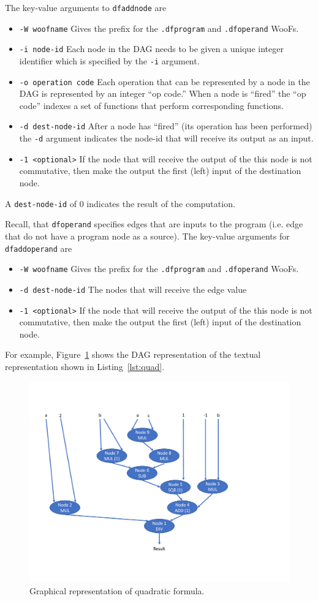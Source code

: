 \documentclass[10pt]{article}
\begin{document}
The key-value arguments to \verb+dfaddnode+ are
\begin{itemize}
\item \verb+-W woofname+ Gives the prefix for the \verb+.dfprogram+ and
\verb+.dfoperand+ WooFs.
\item \verb+-i node-id+ Each node in the DAG needs to be given a unique
integer identifier which is specified by the \verb+-i+ argument.
\item \verb+-o operation code+ Each operation that can be represented
by a node in the DAG is represented by an integer ``op code.''  When a node is
``fired'' the ``op code'' indexes a set of functions that perform
corresponding functions.    
\item \verb+-d dest-node-id+ After a node has ``fired'' (its operation
has been performed) the \verb+-d+ argument indicates the node-id that will
receive its output as an input.
\item \verb+-1 <optional>+ If the node that will receive the output of the
this node is not commutative, then make the output the first (left) input of
the destination node.
\end{itemize}
A \verb+dest-node-id+ of $0$ indicates the result of the computation.  

Recall, that \verb+dfoperand+ specifies edges that are inputs to the program
(i.e. edge that do not have a program node as a source). 
The key-value arguments for \verb+dfaddoperand+ are
\begin{itemize}
\item \verb+-W woofname+ Gives the prefix for the \verb+.dfprogram+ and 
\verb+.dfoperand+ WooFs.
\item \verb+-d dest-node-id+ The nodes that will receive the edge value
\item \verb+-1 <optional>+ If the node that will receive the output of the 
this node is not commutative, then make the output the first (left) input of 
the destination node.
\end{itemize}

For example, Figure~\ref{fig:quad} shows the DAG representation of the textual
representation shown in Listing~\ref{lst:quad}.
\begin{figure}[h]
\centering
\includegraphics[scale=0.3]{quad.pdf}
\caption{Graphical representation of quadratic formula.\label{fig:quad}}
\end{figure}
\end{document}
